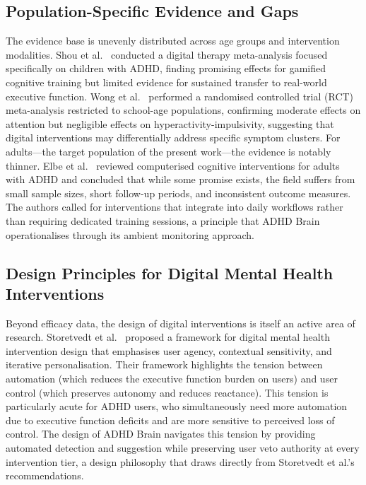 \subsection{Population-Specific Evidence and Gaps}
\label{sec:litrev_population_evidence}

The evidence base is unevenly distributed across age groups and intervention modalities. Shou et al.~\cite{shou2023} conducted a digital therapy meta-analysis focused specifically on children with ADHD, finding promising effects for gamified cognitive training but limited evidence for sustained transfer to real-world executive function. Wong et al.~\cite{wong2023} performed a randomised controlled trial (RCT) meta-analysis restricted to school-age populations, confirming moderate effects on attention but negligible effects on hyperactivity-impulsivity, suggesting that digital interventions may differentially address specific symptom clusters. For adults---the target population of the present work---the evidence is notably thinner. Elbe et al.~\cite{elbe2023} reviewed computerised cognitive interventions for adults with ADHD and concluded that while some promise exists, the field suffers from small sample sizes, short follow-up periods, and inconsistent outcome measures. The authors called for interventions that integrate into daily workflows rather than requiring dedicated training sessions, a principle that ADHD Brain operationalises through its ambient monitoring approach.

\subsection{Design Principles for Digital Mental Health Interventions}
\label{sec:litrev_design_principles}

Beyond efficacy data, the design of digital interventions is itself an active area of research. Storetvedt et al.~\cite{storetvedt2024} proposed a framework for digital mental health intervention design that emphasises user agency, contextual sensitivity, and iterative personalisation. Their framework highlights the tension between automation (which reduces the executive function burden on users) and user control (which preserves autonomy and reduces reactance). This tension is particularly acute for ADHD users, who simultaneously need more automation due to executive function deficits and are more sensitive to perceived loss of control. The design of ADHD Brain navigates this tension by providing automated detection and suggestion while preserving user veto authority at every intervention tier, a design philosophy that draws directly from Storetvedt et al.'s recommendations.


